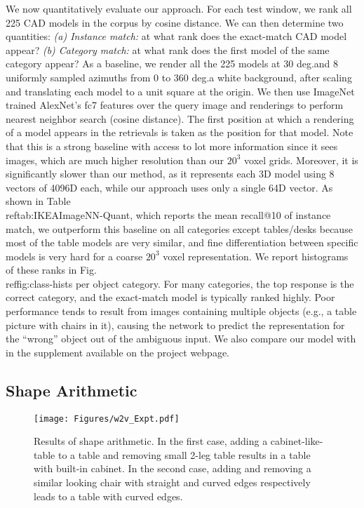 \documentclass[runningheads]{llncs}
\begin{document}
We now quantitatively evaluate our approach. For each test window, we rank
all 225 CAD models in the corpus by cosine distance. We can
then determine 
two quantities: {\it (a) Instance match:} 
at what rank does the exact-match CAD model appear?
{\it (b) Category match:} at what rank does the first model of the same
category appear? 
As a baseline, we render all the 225 models at 30 deg.\elevation and 8 uniformly sampled
azimuths from 0 to 360 deg.\onto a white background, after scaling and translating
each model to a unit square at the origin. We then use ImageNet 
trained AlexNet's fc7 features over the query image and renderings to perform nearest neighbor
search (cosine distance). The first position at which a rendering of a model appears in the retrievals is taken
as the position for that model. Note that this is a strong baseline 
with access to lot more
information since it sees images, which are much higher resolution 
than our $20^3$ voxel grids. Moreover, it is significantly slower than our method, as it represents each 
3D model using 8 vectors of 4096D each, while our approach uses only a single 64D vector. 
As shown in Table\\ref{tab:IKEAImageNN-Quant},
which reports the mean recall@10 of instance match,
we outperform
this baseline on all categories except tables/desks because 
most of the table models are very similar, and
fine differentiation between specific models
is very hard for a coarse $20^3$ voxel representation.
We report histograms of these ranks in Fig.\\ref{fig:class-hists} per object category. 
For many categories, the 
top response is the correct category,
and the exact-match model is typically ranked highly.
Poor performance tends to result from images containing multiple objects
(e.g., a table picture with chairs in it), causing the network to predict
the representation for the ``wrong'' object out of the ambiguous input.
We also compare our model with \cite{Li15} in the supplement available on the project webpage.

\subsection{Shape Arithmetic}\label{sec:exp_arithmetic}\begin{figure}[t]
\texttt{[image: Figures/w2v\_Expt.pdf]} 
\caption{Results of shape arithmetic. In the first case, adding a cabinet-like-table to 
a table and removing small 2-leg table results in a table with built-in cabinet. In the second
case, adding and removing a similar looking chair with straight and curved edges respectively
leads to a table with curved edges.}
\label{fig:arithmetic}
\end{figure}
\end{document}
